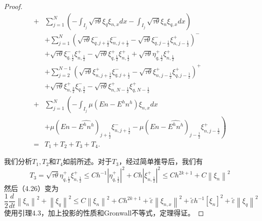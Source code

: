 \begin{proof}
\begin{equation}
\begin{aligned}
            + & \sum_{j=1}^{N}\left(-\int_{I_{j}} \sqrt{\tau \theta} \xi_{q} \xi_{n, x} d x-\int_{I_{j}} \sqrt{\tau \theta} \xi_{n} \xi_{q, x} d x\right)                                                                        \\
              & +\sum_{j=1}^{N}\left(\sqrt{\tau \theta} \xi_{q, j+\frac{1}{2}}^{-} \xi_{n, j+\frac{1}{2}}^{-}-\sqrt{\tau \theta} \xi_{q, j-\frac{1}{2}}^{-} \xi_{n, j-\frac{1}{2}}^{+}\right)^{-}                                \\
              & +\sqrt{\tau \theta} \xi_{q, \frac{1}{2}}^{-} \xi_{n, \frac{1}{2}}^{+}-\sqrt{\tau \theta} \xi_{q, \frac{1}{2}}^{+} \xi_{n, \frac{1}{2}}^{+}+\sqrt{\tau \theta} \eta_{q, \frac{1}{2}}^{+} \xi_{n, \frac{1}{2}}^{+} \\
              & +\sum_{j=2}^{N-1}\left(\sqrt{\tau \theta} \xi_{n, j+\frac{1}{2}}^{+} \xi_{q, j+\frac{1}{2}}^{-}-\sqrt{\tau \theta} \xi_{n, j-\frac{1}{2}}^{+} \xi_{q, j-\frac{1}{2}}^{+}\right)^{+}                              \\
              & +\sqrt{\tau \theta} \xi_{n, \frac{3}{2}}^{+} \xi_{q, \frac{3}{2}}^{-}-\sqrt{\tau \theta} \xi_{n, N-\frac{1}{2}}^{+} \xi_{q, N-\frac{1}{2}}^{+}                                                                   \\
            + & \sum_{j=1}^{N}\left(-\int_{I_{j}} \mu\left(E n-E^{h} n^{h}\right) \xi_{n, x} d x\right.                                                                                                                          \\
              & \left.+\mu\left(E n-\widehat{E^{h} n^{h}}\right)_{j+\frac{1}{2}} \xi_{n, j+\frac{1}{2}}^{-}-\mu\left(E n-\widehat{E^{h} n^{h}}\right)_{j-\frac{1}{2}} \xi_{n, j-\frac{1}{2}}^{+}\right)                          \\
            = & T_{1}+T_{2}+T_{3}+T_{4} .
        \end{aligned}
    \end{equation}


    我们分析$T_{1}, T_{2}$和$T_{4}$如前所述。对于$T_{3}$，经过简单推导后，我们有
    \begin{equation}
        T_{3}=\sqrt{\tau \theta} \eta_{q, \frac{1}{2}}^{+} \xi_{n, \frac{1}{2}}^{+} \leq C h^{-1}\left|\eta_{q, \frac{1}{2}}^{+}\right|^{2}+C h\left|\xi_{n, \frac{1}{2}}^{+}\right|^{2} \leq C h^{2 k+1}+C\left\|\xi_{n}\right\|^{2}
    \end{equation}
    然后（4.26）变为
    \begin{equation}
        \frac{1}{2} \frac{d}{d t}\left\|\xi_{n}\right\|^{2}+\left\|\xi_{q}\right\|^{2} \leq C\left\|\xi_{n}\right\|^{2}+C h^{2 k+1}+\tilde{\varepsilon}\left\|\xi_{n, x}\right\|^{2}+\tilde{\varepsilon} h^{-1}\left[\xi_{n}\right]^{2}+\tilde{\varepsilon}\left\|\xi_{q}\right\|^{2}
    \end{equation}
    使用引理4.3，加上投影的性质和Gronwall不等式，定理得证。
\end{proof}
